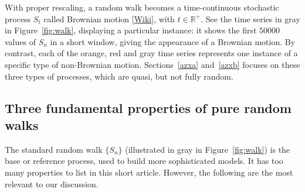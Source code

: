 \documentclass[oneside,10pt]{book}
\begin{document}
With proper rescaling, a random walk becomes a time-continuous stochastic process $S_t$ called \textcolor{index}{Brownian motion} [\href{https://en.wikipedia.org/wiki/Brownian_motion}{Wiki}], with $t\in\mathbb{R}^+$. See the time series in gray in Figure~\ref{fig:walk}, displaying a particular instance: it shows the first $\num{50000}$ values of
 $S_n$ in a short window, giving the appearance of a Brownian motion.
By contrast, each of the orange, red and gray time series represents one instance of a specific type of non-Brownian motion. Sections~\ref{azxa} and~\ref{azxb} focuses on these three types of processes,  which are quasi, but not fully random.





\subsection{Three fundamental properties of pure random walks}\label{poyt}

The standard random walk $\{S_n\}$ (illustrated in gray in Figure~\ref{fig:walk}) is the base or reference process, used to build more sophisticated models. It has too many properties to list in this short article. However, the following are the most relevant to our discussion.
\end{document}
